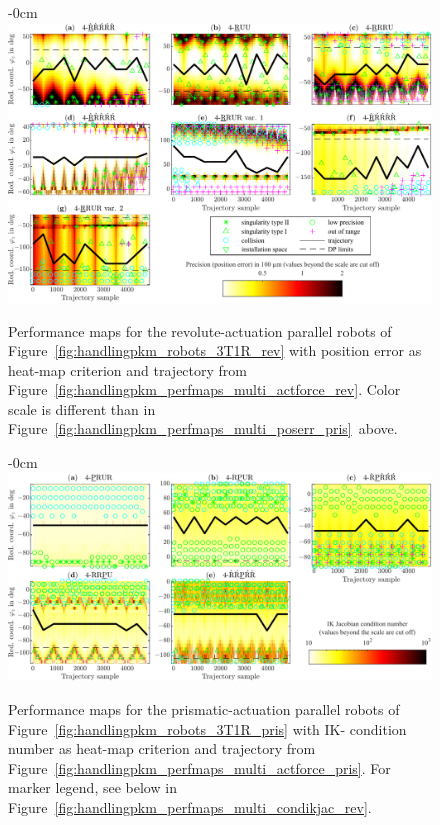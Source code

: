 \vspace{-12pt}
\begin{figure}[H]
\begin{adjustwidth}{-\extralength}{0cm}
  \centering
  \includegraphics{Figures/handlingpkm_perfmaps_default_revolute_multi_positionerror_maxactforce.pdf}
\end{adjustwidth}
\caption{Performance
  maps for the revolute-actuation parallel robots of Figure~\ref{fig:handlingpkm_robots_3T1R_rev} with position error as heat-map criterion and trajectory from Figure~\ref{fig:handlingpkm_perfmaps_multi_actforce_rev}. Color scale is different than in Figure~\ref{fig:handlingpkm_perfmaps_multi_poserr_pris}~above.}
\label{fig:handlingpkm_perfmaps_multi_poserr_rev}
\end{figure} 

\begin{figure}[H]
\begin{adjustwidth}{-\extralength}{0cm}
  \centering
  \includegraphics{Figures/handlingpkm_perfmaps_default_prismatic_multi_cond_ikjac_maxactforce.pdf}
\end{adjustwidth}
\caption{Performance
  maps for the prismatic-actuation parallel robots of Figure~\ref{fig:handlingpkm_robots_3T1R_pris} with IK- condition number as heat-map criterion and trajectory from Figure~\ref{fig:handlingpkm_perfmaps_multi_actforce_pris}. For marker legend, see below in Figure~\ref{fig:handlingpkm_perfmaps_multi_condikjac_rev}.}
\label{fig:handlingpkm_perfmaps_multi_condikjac_pris}
\end{figure} 

